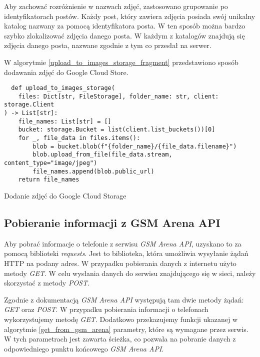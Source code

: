 Aby zachować rozróżnienie w nazwach zdjęć, zastosowano grupowanie po identyfikatorach postów. Każdy post, który zawiera zdjęcia posiada swój unikalny katalog nazwany za pomocą identyfikatora posta. W ten sposób można bardzo szybko zlokalizować zdjęcia danego posta. W każdym z katalogów znajdują się zdjęcia danego posta, nazwane zgodnie z tym co przesłał na serwer.

W algorytmie \ref{upload_to_images_storage_fragment} przedstawiono sposób dodawania zdjęć do Google Cloud Store. 

\begin{code}[H]
  \begin{verbatim}
  def upload_to_images_storage(
    files: Dict[str, FileStorage], folder_name: str, client: storage.Client
) -> List[str]:
    file_names: List[str] = []
    bucket: storage.Bucket = list(client.list_buckets())[0]
    for _, file_data in files.items():
        blob = bucket.blob(f"{folder_name}/{file_data.filename}")
        blob.upload_from_file(file_data.stream, content_type="image/jpeg")
        file_names.append(blob.public_url)
    return file_names
  \end{verbatim}
  \caption{Dodanie zdjęć do Google Cloud Storage}
  \label{upload_to_images_storage_fragment}
\end{code}

\subsection{Pobieranie informacji z GSM Arena API}
Aby pobrać informacje o telefonie z serwisu \textit{GSM Arena API}, uzyskano to za pomocą biblioteki \textit{requests}. Jest to biblioteka, która umożliwia wysyłanie żądań HTTP na podany adres. W przypadku pobierania danych z internetu użyto metody \textit{GET}. W celu wysłania danych do serwisu znajdującego się w sieci, należy skorzystać z metody \textit{POST}.

Zgodnie z dokumentacją \textit{GSM Arena API} \cite{gsm_arena_api_reference} występują tam dwie metody żądań: \textit{GET} oraz \textit{POST}. W przypadku pobierania informacji o telefonach wykorzystujemy metodę \textit{GET}. Dodatkowo przekazujemy funkcji ukazanej w algorytmie \ref{get_from_gsm_arena} parametry, które są wymagane przez serwis. W tych parametrach jest zawarta ścieżka, co pozwala na pobranie danych z odpowiedniego punktu końcowego \textit{GSM Arena API}.

